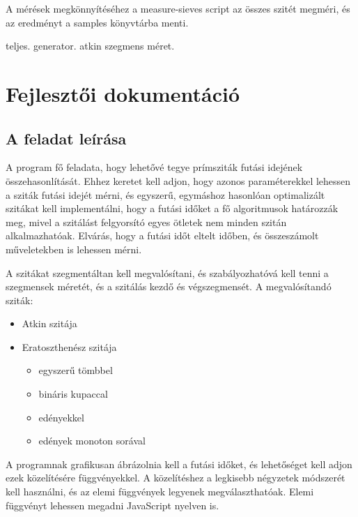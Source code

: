 \documentclass[12pt]{report}
\begin{document}
A mérések megkönnyítéséhez a measure-sieves script az összes szitét megméri,
és az eredményt a samples könyvtárba menti.

{\color{red}teljes. generator. atkin szegmens méret.}

\chapter{Fejlesztői dokumentáció}

\section{A feladat leírása}

A program fő feladata, hogy lehetővé tegye prímsziták futási idejének összehasonlítását.
Ehhez keretet kell adjon, hogy azonos paraméterekkel lehessen a sziták futási idejét mérni,
és egyszerű, egymáshoz hasonlóan optimalizált szitákat kell implementálni,
hogy a futási időket a fő algoritmusok határozzák meg, mivel a szitálást felgyorsító
egyes ötletek nem minden szitán alkalmazhatóak.
Elvárás, hogy a futási időt eltelt időben, és összeszámolt műveletekben is lehessen mérni.

A szitákat szegmentáltan kell megvalósítani, és szabályozhatóvá kell tenni
a szegmensek méretét, és a szitálás kezdő és végszegmensét. A megvalósítandó sziták:
\begin{itemize}
\item Atkin szitája
\item Eratoszthenész szitája
\begin{itemize}
\item egyszerű tömbbel
\item bináris kupaccal
\item edényekkel
\item edények monoton sorával
\end{itemize}
\end{itemize}

A programnak grafikusan ábrázolnia kell a futási időket, és lehetőséget kell adjon
ezek közelítésére függvényekkel. A közelítéshez a legkisebb négyzetek módszerét
kell használni, és az elemi függvények legyenek megválaszthatóak.
Elemi függvényt lehessen megadni JavaScript nyelven is.
\end{document}
